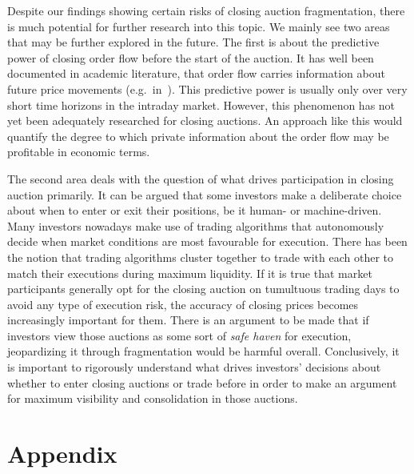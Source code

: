 \documentclass[11pt,a4paper]{article}
\begin{document}
    Despite our findings showing certain risks of closing auction fragmentation, there is much potential for further research into this topic. We mainly see two areas that may be further explored in the future. The first is about the predictive power of closing order flow before the start of the auction. It has well been documented in academic literature, that order flow carries information about future price movements (e.g.\ in~\textcite{ChordiaRollSubrahmanyam2005,ChordiaRollSubrahmanyam2008}). This predictive power is usually only over very short time horizons in the intraday market. However, this phenomenon has not yet been adequately researched for closing auctions. An approach like this would quantify the degree to which private information about the order flow may be profitable in economic terms.

    The second area deals with the question of what drives participation in closing auction primarily. It can be argued that some investors make a deliberate choice about when to enter or exit their positions, be it human- or machine-driven. Many investors nowadays make use of trading algorithms that autonomously decide when market conditions are most favourable for execution. There has been the notion that trading algorithms cluster together to trade with each other to match their executions during maximum liquidity. If it is true that market participants generally opt for the closing auction on tumultuous trading days to avoid any type of execution risk, the accuracy of closing prices becomes increasingly important for them. There is an argument to be made that if investors view those auctions as some sort of \emph{safe haven} for execution, jeopardizing it through fragmentation would be harmful overall. Conclusively, it is important to rigorously understand what drives investors' decisions about whether to enter closing auctions or trade before in order to make an argument for maximum visibility and consolidation in those auctions.

    \clearpage

    \printbibliography[heading=bibintoc]

    \clearpage
    \appendix


    \section{Appendix} \label{sec:Appendix}
\end{document}
